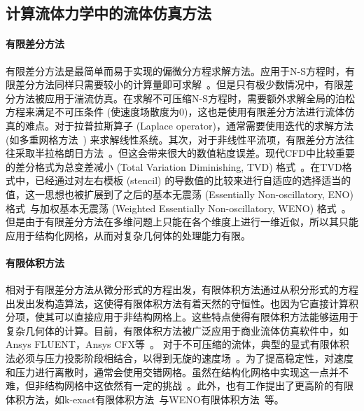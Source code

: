 \subsection{计算流体力学中的流体仿真方法}
\paragraph{有限差分方法}
有限差分方法是最简单而易于实现的偏微分方程求解方法。应用于N-S方程时，有限差分方法同样只需要较小的计算量即可求解~\cite{ kooij2018comparison,vreman2014comparison}。但是只有极少数情况中，有限差分方法被应用于湍流仿真。在求解不可压缩N-S方程时，需要额外求解全局的泊松方程来满足不可压条件 (使速度场散度为0)，这也是使用有限差分方法进行流体仿真的难点。对于拉普拉斯算子 (Laplace operator)，通常需要使用迭代的求解方法 (如多重网格方法~\cite{golub2013matrix}) 来求解线性系统。其次，对于非线性平流项，有限差分方法往往采取半拉格朗日方法~\cite{smolarkiewicz1992class}。但这会带来很大的数值粘度误差。现代CFD中比较重要的差分格式为总变差减小 (Total Variation Diminishing, TVD) 格式~\cite{osher1986very, YEE1985327, HARTEN1983357}。在TVD格式中，已经通过对左右模板 (stencil) 的导数值的比较来进行自适应的选择适当的值，这一思想也被扩展到了之后的基本无震荡 (Essentially Non-oscillatory, ENO) 格式~\cite{HARTEN19973, SHU198932, SHU1988439}与加权基本无震荡 (Weighted Essentially Non-oscillatory, WENO) 格式~\cite{LIU1994200}。但是由于有限差分方法在多维问题上只能在各个维度上进行一维近似，所以其只能应用于结构化网格，从而对复杂几何体的处理能力有限。

\paragraph{有限体积方法}
相对于有限差分方法从微分形式的方程出发，有限体积方法通过从积分形式的方程出发出发构造算法，这使得有限体积方法有着天然的守恒性。也因为它直接计算积分项，使其可以直接应用于非结构网格上。这些特点使得有限体积方法能够运用于复杂几何体的计算。目前，有限体积方法被广泛应用于商业流体仿真软件中，如Ansys FLUENT，Ansys CFX等~\cite{JEONG201419}。 
对于不可压缩的流体，典型的显式有限体积法必须与压力投影阶段相结合，以得到无旋的速度场~\cite{https://doi.org/10.1002/fld.310, pember1996higher}。为了提高稳定性，对速度和压力进行离散时，通常会使用交错网格。虽然在结构化网格中实现这一点并不难，但非结构网格中这依然有一定的挑战~\cite{herbin2012staggered, gao2012unstructured, bermudez1998upwind}。此外，也有工作提出了更高阶的有限体积方法，如k-exact有限体积方法~\cite{barth1990higher}与WENO有限体积方法~\cite{HU199997}等。

